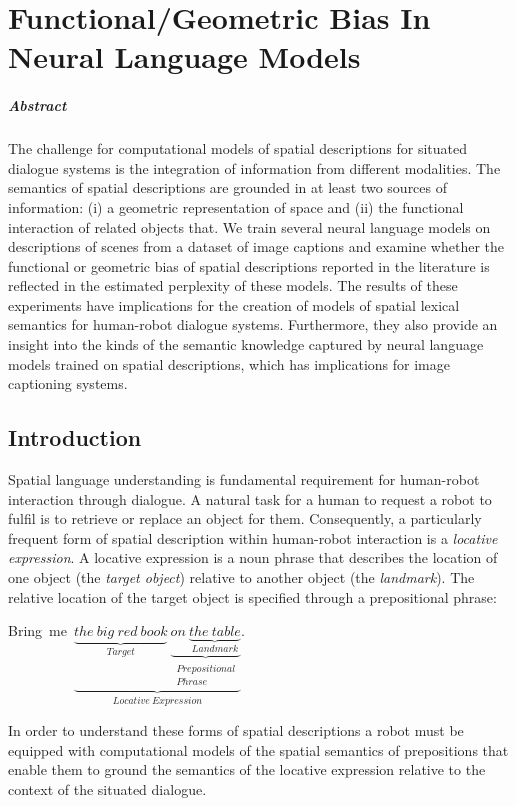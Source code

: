 
\chapter{Functional/Geometric Bias In Neural Language Models}

\paragraph{Abstract}
  The challenge for computational models of spatial descriptions for
  situated dialogue systems is the integration of information from
  different modalities. The semantics of spatial descriptions are
  grounded in at least two sources of information: (i) a
  geometric representation of space and (ii) the functional interaction
  of related objects that. We
  train several neural language models on descriptions of scenes from
  a dataset of image captions and examine
  whether the functional %
  or geometric %
  bias of spatial descriptions reported in the literature is reflected
  in the estimated perplexity of these models. The results of these experiments have implications for the creation of models of spatial lexical semantics for human-robot dialogue systems. Furthermore, they also provide an insight into the kinds of the semantic knowledge captured by neural
  language models trained on spatial descriptions, which has implications for image captioning systems.



\section{Introduction}\label{splu2018:sec:spatial-descriptions}

Spatial language understanding is fundamental requirement for human-robot interaction through dialogue. A natural task for a human to request a robot to fulfil is to retrieve or replace an object for them. Consequently, a particularly frequent form of spatial description within human-robot interaction is a \emph{locative expression}. A locative expression is a noun phrase that describes the location of one object (the \emph{target object}) relative to another object (the \emph{landmark}). The relative location of the target object is specified through a %
prepositional phrase:
\begin{center}
Bring~me~$\underbrace{\underbrace{the~big~red~book}_{Target}~\underbrace{on~\underbrace{the~table}_{Landmark}}_{\substack{Prepositional\\Phrase}}}_{Locative~Expression}$.
\end{center}
\noindent In order to understand these forms of spatial descriptions a robot must be equipped with computational models of the spatial semantics of prepositions that enable them to ground the semantics of the locative expression relative to the context of the situated dialogue.

